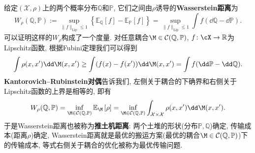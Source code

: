给定$(\mathcal{X}, \rho)$上的两个概率分布$\mathbb{Q}$和$\mathbb{P}$, 它们之间由$\rho$诱导的\textbf{Wasserstein距离}为
\begin{equation*}
	W_{\rho}(\mathbb{Q}, \mathbb{P}) 
	:= \sup_{\|f\|_{\text{Lip}} \leq 1} \left\{ \mathbb{E}_{\mathbb{Q}} [f] - \mathbb{E}_{\mathbb{P}} [f] \right\}
	= \sup_{\|f\|_{\text{Lip}} \leq 1} \int f (\dd \mathbb{Q} - \dd \mathbb{P}). 
\end{equation*}
可以证明这样的$W_{\rho}$构成了一个度量. 
对任意耦合$\M \in \mathcal{C}(\mathbb{Q}, \mathbb{P})$, $f \colon \cX \to \mathbb{R}$为Lipschitz函数, 根据Fubini定理我们可以得到
\begin{equation*}
	\int \rho(x, x') \dd \M(x, x')
	\geq \int (f(x) - f(x')) \dd \M(x, x')
	= \int f(\dd \mathbb{P} - \dd \mathbb{Q}). 
\end{equation*}
\textbf{Kantorovich–Rubinstein对偶}告诉我们, 左侧关于耦合的下确界和右侧关于Lipschitz函数的上界是相等的, 即有
\begin{equation*}
	W_{\rho}(\mathbb{Q}, \mathbb{P})
	= \inf_{\M \in \mathcal{C}(\mathbb{Q}, \mathbb{P})} \mathbb{E}_{\M} \left[ \rho \right]
	= \inf_{\M \in \mathcal{C}(\mathbb{Q}, \mathbb{P})} \int_{\mathcal{X} \times \mathcal{X}} \rho(x, x') \dd \M(x, x'). 
\end{equation*}
于是Wasserstein距离也被称为\textbf{推土机距离}: 两个土堆的形状(分布$\mathbb{P}, \mathbb{Q}$)确定, 传输成本(距离$\rho$)确定, Wasserstein距离就是最优的搬运方案(最优的耦合$\M \in \mathcal{C}(\mathbb{Q}, \mathbb{P})$)下的传输成本, 等式右侧关于耦合的优化被称为最优传输问题. 

